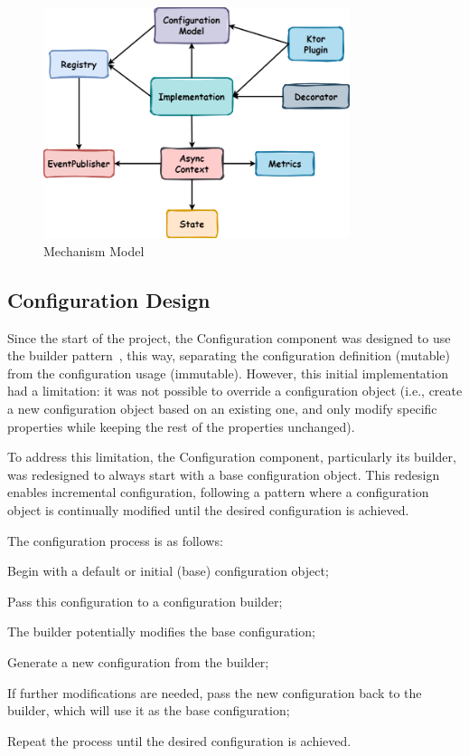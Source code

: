 \begin{figure}[!htb]
    \centering
    \includegraphics[width=0.8\textwidth]{../figures/03_mechanism-model}
    \caption{Mechanism Model}
    \label{fig:mechanism-model}
\end{figure}

\subsection{Configuration Design}\label{subsec:configuration-design}

Since the start of the project, the Configuration component was designed to use the builder pattern~\cite{wiki:builder-pattern}, this way, separating the configuration definition (mutable) from the configuration usage (immutable).
However, this initial implementation had a limitation: it was not possible to override a configuration object (i.e., create a new configuration object based on an existing one, and only modify specific properties while keeping the rest of the properties unchanged).


To address this limitation, the Configuration component, particularly its builder, was redesigned to always start with a base configuration object.
This redesign enables incremental configuration, following a pattern where a configuration object is continually modified until the desired configuration is achieved.

The configuration process is as follows:

\begin{boldenumerate}
    \item Begin with a default or initial (base) configuration object;
    \item Pass this configuration to a configuration builder;
    \item The builder potentially modifies the base configuration;
    \item Generate a new configuration from the builder;
    \item If further modifications are needed, pass the new configuration back to the builder, which will use it as the base configuration;
    \item Repeat the process until the desired configuration is achieved.
\end{boldenumerate}

